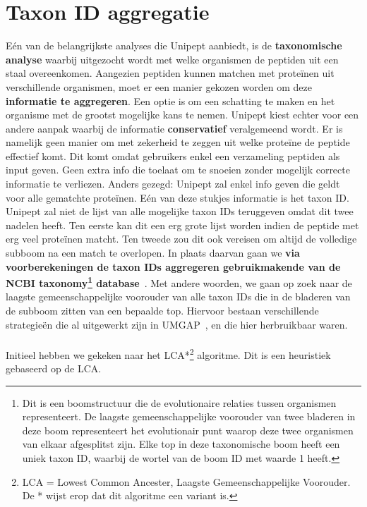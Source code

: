 \section{Taxon ID aggregatie}\label{sec:taxon-id-aggregatie}
Eén van de belangrijkste analyses die Unipept aanbiedt, is de \textbf{taxonomische analyse} waarbij uitgezocht wordt met welke organismen de peptiden uit een staal overeenkomen.
Aangezien peptiden kunnen matchen met proteïnen uit verschillende organismen, moet er een manier gekozen worden om deze \textbf{informatie te aggregeren}.
Een optie is om een schatting te maken en het organisme met de grootst mogelijke kans te nemen.
Unipept kiest echter voor een andere aanpak waarbij de informatie \textbf{conservatief} veralgemeend wordt.
Er is namelijk geen manier om met zekerheid te zeggen uit welke proteïne de peptide effectief komt.
Dit komt omdat gebruikers enkel een verzameling peptiden als input geven.
Geen extra info die toelaat om te snoeien zonder mogelijk correcte informatie te verliezen.
Anders gezegd: Unipept zal enkel info geven die geldt voor alle gematchte proteïnen.
Eén van deze stukjes informatie is het taxon ID\@.
Unipept zal niet de lijst van alle mogelijke taxon IDs teruggeven omdat dit twee nadelen heeft.
Ten eerste kan dit een erg grote lijst worden indien de peptide met erg veel proteïnen matcht.
Ten tweede zou dit ook vereisen om altijd de volledige subboom na een match te overlopen.
In plaats daarvan gaan we \textbf{via voorberekeningen de taxon IDs aggregeren gebruikmakende van de NCBI taxonomy\footnote{Dit is een boomstructuur die de evolutionaire relaties tussen organismen representeert. De laagste gemeenschappelijke voorouder van twee bladeren in deze boom representeert het evolutionair punt waarop deze twee organismen van elkaar afgesplitst zijn. Elke top in deze taxonomische boom heeft een uniek taxon ID, waarbij de wortel van de boom ID met waarde 1 heeft.} database}~\cite{NCBI_original_article, NCBI_update}.
Met andere woorden, we gaan op zoek naar de laagste gemeenschappelijke voorouder van alle taxon IDs die in de bladeren van de subboom zitten van een bepaalde top.
Hiervoor bestaan verschillende strategieën die al uitgewerkt zijn in UMGAP~\cite{UMGAP_paper, UMGAP_source}, en die hier herbruikbaar waren.
\\ \\
Initieel hebben we gekeken naar het LCA*\footnote{LCA = Lowest Common Ancester, Laagste Gemeenschappelijke Voorouder. De * wijst erop dat dit algoritme een variant is.} algoritme.
Dit is een heuristiek gebaseerd op de LCA.

